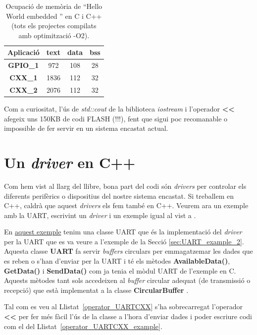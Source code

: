 \begin{table}[!htbp]
\caption{Ocupació de memòria de ``Hello World embedded '' en C i C++ (tots els projectes compilats amb optimització -O2).}
\centering
\begin{tabular}{|c|c|c|c|}
\hline
{\bf Aplicació} & {\bf text} & {\bf data} & {\bf bss}\\
\hline
{\bf GPIO\_1} & 972 & 108 & 28 \\
\hline
{\bf CXX\_1} & 1836 & 112 & 32 \\
\hline
{\bf CXX\_2} & 2076 & 112 & 32 \\
\hline
\end{tabular}
\label{tb:CXX_size}
\end{table}

Com a curiositat, l'ús de {\em std::cout} de la biblioteca {\em iostream} i l'operador {\bf <{}<} afegeix uns 150KB de codi FLASH (!!!), fent que sigui poc recomanable o impossible de fer servir en un sistema encastat actual.

\section{Un {\em driver} en C++}
Com hem vist al llarg del llibre, bona part del codi són {\em drivers} per controlar els diferents perifèrics o dispositius del nostre sistema encastat. Si treballem en C++, caldrà que aquest {\em drivers} els fem també en C++. Veurem ara un exemple amb la \gls{UART}, escrivint un {\em driver} i un exemple igual al vist a .

En \href{https://github.com/mariusmm/cursembedded/tree/master/Simplicity/CXX_UART}{aquest exemple} tenim una classe \gls{UART} que és la implementació del {\em driver} per la UART que es va veure a l'exemple de la Secció \ref{sec:UART_example_2}. Aquesta classe {\bf UART} fa servir {\em buffers} circulars per emmagatzemar les dades que es reben o s'han d'enviar per la UART i té els mètodes {\bf AvailableData()}, {\bf GetData()} i {\bf SendData()} com ja tenia el mòdul UART de l'exemple en C. Aquests mètodes tant sols accedeixen al {\em buffer} circular adequat (de transmissió o recepció) que està implementat a la classe {\bf CircularBuffer} .

Tal com es veu al Llistat~\ref{operator_UARTCXX} s'ha sobrecarregat l'operador {\bf<{}<} per fer més fàcil l'ús de la classe a l'hora d'enviar dades i poder escriure codi com el del Llistat~\ref{operator_UARTCXX_example}.

